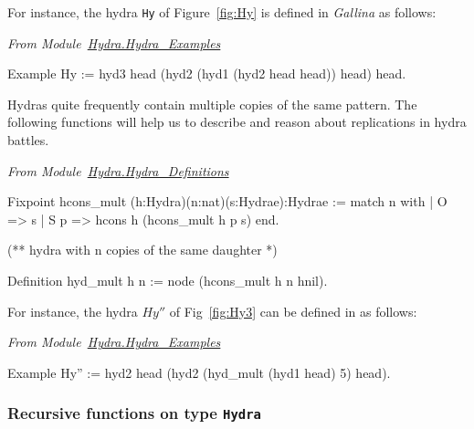\documentclass[a4paper]{book}
\begin{document}
For instance, the hydra \texttt{Hy}  of Figure~\vref{fig:Hy} is defined in \emph{Gallina} as follows:

\vspace{4mm}
\emph{From Module~\href{../src/html/hydras.Hydra.Hydra_Examples.html\#Hy}{Hydra.Hydra\_Examples}}

\begin{Coqsrc}
Example Hy := hyd3 head
                   (hyd2
                      (hyd1 
                         (hyd2 head head))
                      head) 
                   head.
\end{Coqsrc}



Hydras quite frequently contain  multiple  copies of the same pattern. The following functions
will help us to describe and reason about replications in hydra battles.

\vspace{4pt}

\emph{From Module~\href{../src/html/hydras.Hydra.Hydra_Definitions.html\#hcons_mult}{Hydra.Hydra\_Definitions}}

\begin{Coqsrc}
Fixpoint hcons_mult (h:Hydra)(n:nat)(s:Hydrae):Hydrae :=
  match n with 
  | O => s
  | S p => hcons h (hcons_mult h p s)
  end.

(** hydra with n copies of the same daughter *)

Definition hyd_mult h n :=
  node (hcons_mult h n hnil).
\end{Coqsrc}

\vspace{4mm}



For instance, the hydra $Hy''$ of Fig~\vref{fig:Hy3}  can be defined in \coq{} as follows:

\vspace{4pt}

\emph{From Module~\href{../src/html/hydras.Hydra.Hydra_Examples.html}{Hydra.Hydra\_Examples}}

\begin{Coqsrc}
Example Hy'' := 
     hyd2 head
          (hyd2 (hyd_mult (hyd1 head) 5)
                head).
\end{Coqsrc}




\subsubsection{Recursive functions on type \texttt{Hydra}}
\label{sec:orgheadline41}
\label{sec:hsize-def}
\end{document}
